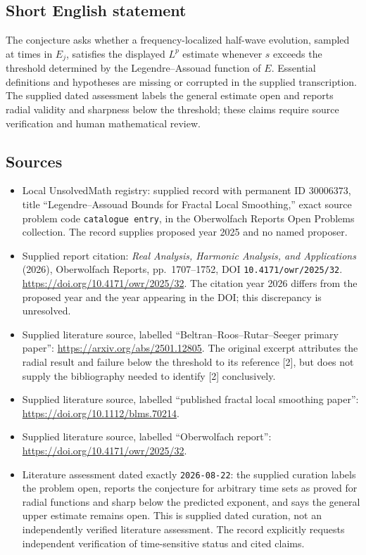 \documentclass[11pt]{article}
\begin{document}
\subsection{Short English statement}
The conjecture asks whether a frequency-localized half-wave evolution, sampled at times in \(E_j\), satisfies the displayed \(L^p\) estimate whenever \(s\) exceeds the threshold determined by the Legendre--Assouad function of \(E\). Essential definitions and hypotheses are missing or corrupted in the supplied transcription. The supplied dated assessment labels the general estimate open and reports radial validity and sharpness below the threshold; these claims require source verification and human mathematical review.
\subsection{Sources}
\begin{itemize}
\item Local UnsolvedMath registry: supplied record with permanent ID \(30006373\), title ``Legendre--Assouad Bounds for Fractal Local Smoothing,'' exact source problem code \texttt{catalogue entry}, in the Oberwolfach Reports Open Problems collection. The record supplies proposed year 2025 and no named proposer.
\item Supplied report citation: \emph{Real Analysis, Harmonic Analysis, and Applications} (2026), Oberwolfach Reports, pp.\ 1707--1752, DOI \texttt{10.4171/owr/2025/32}. \url{https://doi.org/10.4171/owr/2025/32}. The citation year 2026 differs from the proposed year and the year appearing in the DOI; this discrepancy is unresolved.
\item Supplied literature source, labelled ``Beltran--Roos--Rutar--Seeger primary paper'': \url{https://arxiv.org/abs/2501.12805}. The original excerpt attributes the radial result and failure below the threshold to its reference [2], but does not supply the bibliography needed to identify [2] conclusively.
\item Supplied literature source, labelled ``published fractal local smoothing paper'': \url{https://doi.org/10.1112/blms.70214}.
\item Supplied literature source, labelled ``Oberwolfach report'': \url{https://doi.org/10.4171/owr/2025/32}.
\item Literature assessment dated exactly \texttt{2026-08-22}: the supplied curation labels the problem open, reports the conjecture for arbitrary time sets as proved for radial functions and sharp below the predicted exponent, and says the general upper estimate remains open. This is supplied dated curation, not an independently verified literature assessment. The record explicitly requests independent verification of time-sensitive status and cited claims.
\end{itemize}
\end{document}

